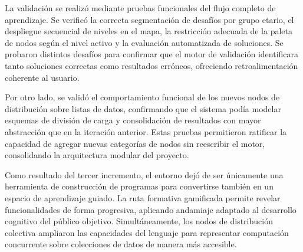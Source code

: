 La validación se realizó mediante pruebas funcionales del flujo completo de aprendizaje. Se verificó la correcta segmentación de desafíos por grupo etario, el despliegue secuencial de niveles en el mapa, la restricción adecuada de la paleta de nodos según el nivel activo y la evaluación automatizada de soluciones. Se probaron distintos desafíos para confirmar que el motor de validación identificara tanto soluciones correctas como resultados erróneos, ofreciendo retroalimentación coherente al usuario.

Por otro lado, se validó el comportamiento funcional de los nuevos nodos de distribución sobre listas de datos, confirmando que el sistema podía modelar esquemas de división de carga y consolidación de resultados con mayor abstracción que en la iteración anterior. Estas pruebas permitieron ratificar la capacidad de agregar nuevas categorías de nodos sin reescribir el motor, consolidando la arquitectura modular del proyecto.

Como resultado del tercer incremento, el entorno dejó de ser únicamente una herramienta de construcción de programas para convertirse también en un espacio de aprendizaje guiado. La ruta formativa gamificada permite revelar funcionalidades de forma progresiva, aplicando andamiaje adaptado al desarrollo cognitivo del público objetivo. Simultáneamente, los nodos de distribución colectiva ampliaron las capacidades del lenguaje para representar computación concurrente sobre colecciones de datos de manera más accesible.